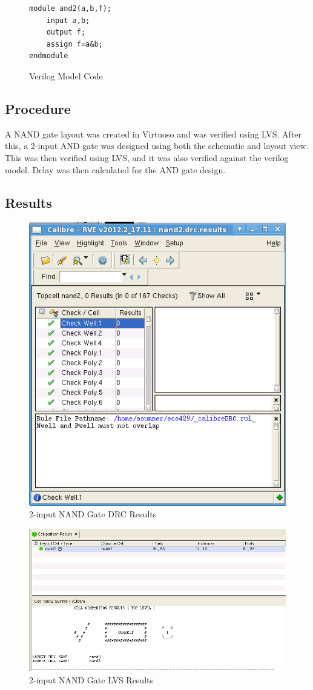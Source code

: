 \documentclass[12pt]{article}
\begin{document}
\begin{figure}[H]
\centering
\lstset{language=Verilog}
\begin{lstlisting}
module and2(a,b,f);
	input a,b;
	output f;
	assign f=a&b;
endmodule
\end{lstlisting}
\caption{Verilog Model Code}
\label{fig:verilog-model}
\end{figure}

\subsection{Procedure}
A NAND gate  layout was created in Virtuoso and was verified using LVS. After this, a 2-input AND gate was designed using both the schematic and layout view. This was then verified using LVS, and it was also verified against the verilog model. Delay was then calculated for the AND gate design.
\subsection{Results}
\begin{figure}[H]
\centering
\includegraphics[width=0.7\linewidth]{drc-nand2}
\caption{2-input NAND Gate DRC Results}
\label{fig:drc-nand2}
\end{figure}

\begin{figure}[H]
\centering
\includegraphics[width=0.7\linewidth]{nand2-lvs}
\caption{2-input NAND Gate LVS Results}
\label{fig:nand2-lvs}
\end{figure}
\end{document}
